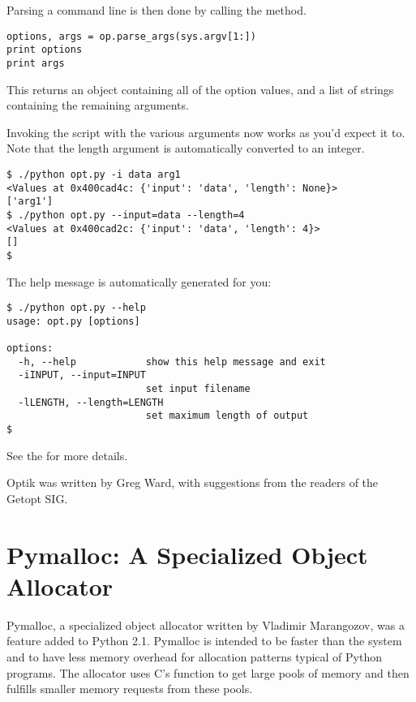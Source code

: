 \documentclass{howto}
\begin{document}
Parsing a command line is then done by calling the 
method.

\begin{verbatim}
options, args = op.parse_args(sys.argv[1:])
print options
print args
\end{verbatim}

This returns an object containing all of the option values,
and a list of strings containing the remaining arguments. 

Invoking the script with the various arguments now works as you'd
expect it to.  Note that the length argument is automatically
converted to an integer.

\begin{verbatim}
$ ./python opt.py -i data arg1
<Values at 0x400cad4c: {'input': 'data', 'length': None}>
['arg1']
$ ./python opt.py --input=data --length=4
<Values at 0x400cad2c: {'input': 'data', 'length': 4}>
[]
$
\end{verbatim}

The help message is automatically generated for you:

\begin{verbatim}
$ ./python opt.py --help
usage: opt.py [options]

options:
  -h, --help            show this help message and exit
  -iINPUT, --input=INPUT
                        set input filename
  -lLENGTH, --length=LENGTH
                        set maximum length of output
$ 
\end{verbatim}

See the 
for more details.

Optik was written by Greg Ward, with suggestions from the readers of
the Getopt SIG.


\section{Pymalloc: A Specialized Object Allocator\label{section-pymalloc}}

Pymalloc, a specialized object allocator written by Vladimir
Marangozov, was a feature added to Python 2.1.  Pymalloc is intended
to be faster than the system  and to have less
memory overhead for allocation patterns typical of Python programs.
The allocator uses C's  function to get large
pools of memory and then fulfills smaller memory requests from these
pools.
\end{document}

